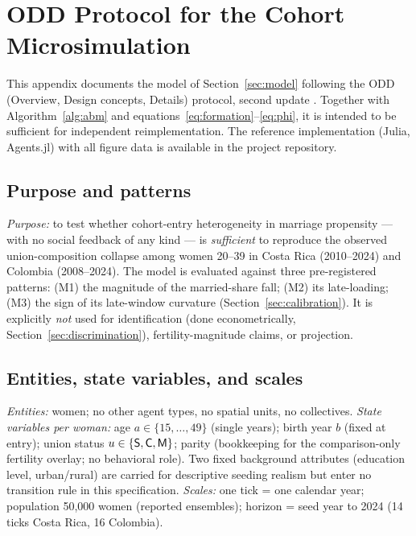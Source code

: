 \section{ODD Protocol for the Cohort Microsimulation}
\label{app:odd}

This appendix documents the model of Section~\ref{sec:model} following the ODD
(Overview, Design concepts, Details) protocol, second update
\citep{grimm2020odd}. Together with Algorithm~\ref{alg:abm} and
equations~\eqref{eq:formation}--\eqref{eq:phi}, it is intended to be sufficient
for independent reimplementation. The reference implementation (Julia,
Agents.jl) with all figure data is available in the project repository.

\subsection{Purpose and patterns}

\emph{Purpose:} to test whether cohort-entry heterogeneity in marriage
propensity --- with no social feedback of any kind --- is \emph{sufficient} to
reproduce the observed union-composition collapse among women 20--39 in Costa
Rica (2010--2024) and Colombia (2008--2024). The model is evaluated against
three pre-registered patterns: (M1) the magnitude of the married-share fall;
(M2) its late-loading; (M3) the sign of its late-window curvature
(Section~\ref{sec:calibration}). It is explicitly \emph{not} used for
identification (done econometrically, Section~\ref{sec:discrimination}),
fertility-magnitude claims, or projection.

\subsection{Entities, state variables, and scales}

\emph{Entities:} women; no other agent types, no spatial units, no collectives.
\emph{State variables per woman:} age $a \in \{15,\dots,49\}$ (single years);
birth year $b$ (fixed at entry); union status
$u \in \{\mathsf{S},\mathsf{C},\mathsf{M}\}$; parity (bookkeeping for the comparison-only
fertility overlay; no behavioral role). Two fixed background attributes
(education level, urban/rural) are carried for descriptive seeding realism but
enter no transition rule in this specification.
\emph{Scales:} one tick = one calendar year; population 50{,}000 women
(reported ensembles); horizon = seed year to 2024 (14 ticks Costa Rica, 16
Colombia).

